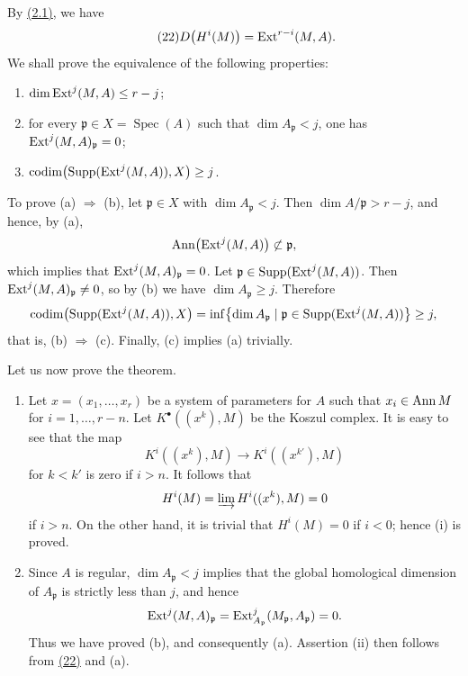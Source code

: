 By \textup{\hyperref[V.2.1]{(2.1)}}, we have
\begin{equation}\tag{22}\label{eq:V.22}
  D\bigl(H^i(M)\bigr)=\operatorname{Ext}^{r-i}(M,A).
\end{equation}
We shall prove the equivalence of the following properties:
\begin{enumerate}
\item[(a)] $\dim \operatorname{Ext}^j(M,A)\leq r-j$;
\item[(b)] for every $\mathfrak p\in X=\operatorname{Spec}(A)$ such that
  $\dim A_{\mathfrak p}<j$, one has
  $\operatorname{Ext}^j(M,A)_{\mathfrak p}=0$;
\item[(c)]
  $\operatorname{codim}\bigl(\operatorname{Supp}(\operatorname{Ext}^j(M,A)),X\bigr)\geq j$.
\end{enumerate}

To prove \textup{(a)} $\Longrightarrow$ \textup{(b)}, let
$\mathfrak p\in X$ with $\dim A_{\mathfrak p}<j$. Then
$\dim A/\mathfrak p>r-j$, and hence, by \textup{(a)},
\[
  \operatorname{Ann}\bigl(\operatorname{Ext}^j(M,A)\bigr)\not\subset\mathfrak p,
\]
which implies that $\operatorname{Ext}^j(M,A)_{\mathfrak p}=0$. Let
$\mathfrak p\in\operatorname{Supp}(\operatorname{Ext}^j(M,A))$. Then
$\operatorname{Ext}^j(M,A)_{\mathfrak p}\neq0$, so by \textup{(b)} we have
$\dim A_{\mathfrak p}\geq j$. Therefore
\[
  \operatorname{codim}\bigl(\operatorname{Supp}(\operatorname{Ext}^j(M,A)),X\bigr)
  =\inf\bigl\{\dim A_{\mathfrak p}\mid
  \mathfrak p\in\operatorname{Supp}(\operatorname{Ext}^j(M,A))\bigr\}\geq j,
\]
that is, \textup{(b)} $\Longrightarrow$ \textup{(c)}. Finally,
\textup{(c)} implies \textup{(a)} trivially.

\noindent{}Let us now prove the theorem.
\begin{enumerate}
\item[(i)]
Let $x=(x_1,\dots,x_r)$ be a system of parameters for $A$ such that
$x_i\in\operatorname{Ann} M$ for $i=1,\dots,r-n$. Let
$K^\bullet((x^k),M)$ be the Koszul complex. It is easy to see that the map
\[
  K^i((x^k),M)\longrightarrow K^i((x^{k'}),M)
\]
for $k<k'$ is zero if $i>n$. It follows that
\[
  H^i(M)=\varinjlim H^i((x^k),M)=0
\]
if $i>n$. On the other hand, it is trivial that $H^i(M)=0$ if $i<0$;
hence \textup{(i)} is proved.

\item[(ii)]
Since $A$ is regular, $\dim A_{\mathfrak p}<j$ implies that the global
homological dimension of $A_{\mathfrak p}$ is strictly less than $j$, and
hence
\[
  \operatorname{Ext}^j(M,A)_{\mathfrak p}
  =\operatorname{Ext}^j_{A_{\mathfrak p}}(M_{\mathfrak p},A_{\mathfrak p})=0.
\]
Thus we have proved \textup{(b)}, and consequently \textup{(a)}.
Assertion \textup{(ii)} then follows from \textup{\hyperref[eq:V.22]{(22)}} and
\textup{(a)}.
\end{enumerate}

